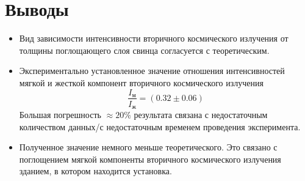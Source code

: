 \documentclass[a4paper,12pt]{article} %
\begin{document}
\section{Выводы}
\begin{itemize}
\item Вид зависимости интенсивности вторичного космического излучения от толщины поглощающего слоя свинца согласуется с теоретическим. 
\item Экспериментально установленное значение отношения интенсивностей мягкой и жесткой компонент вторичного космического излучения
\begin{equation*}
     \frac{I_\text{м}}{I_\text{ж}} = (0.32 \pm 0.06)
\end{equation*}
Большая погрешность $\approx 20\%$ результата связана с недостаточным количеством данных/с недостаточным временем проведения эксперимента.
\item Полученное значение немного меньше теоретического. Это связано с поглощением мягкой компоненты вторичного космического излучения зданием, в котором находится установка.
\end{itemize}
\end{document}

